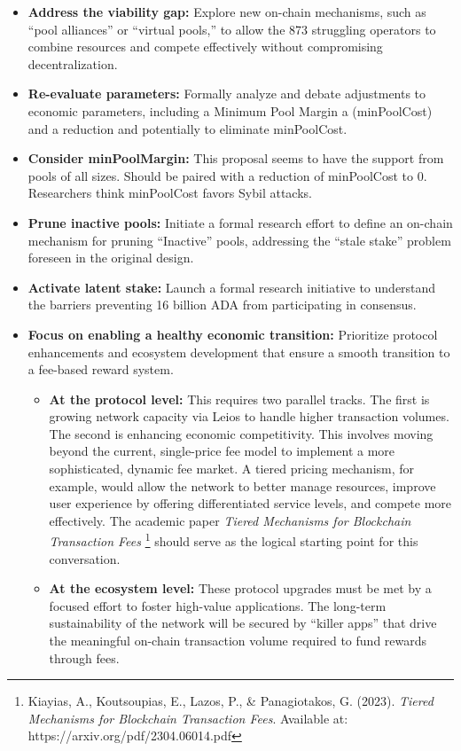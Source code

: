 \documentclass[11pt, letterpaper]{article}
\begin{document}
\begin{itemize}
    \item \textbf{Address the viability gap:} Explore new on-chain mechanisms, such as ``pool alliances'' or ``virtual pools,'' to allow the 873 struggling 
	operators to combine resources and compete effectively without compromising decentralization.
    
    \item \textbf{Re-evaluate parameters:} Formally analyze and debate adjustments to economic parameters, including a Minimum Pool Margin a (minPoolCost) and a reduction 
	and potentially to eliminate minPoolCost.

    \item \textbf{Consider minPoolMargin:} This proposal seems to have the support from pools of all sizes. Should be paired with a reduction of minPoolCost 
	to 0. Researchers think minPoolCost favors Sybil attacks.

	\item \textbf{Prune inactive pools:} Initiate a formal research effort to define an on-chain mechanism for pruning ``Inactive'' pools, addressing the 
	``stale stake'' problem foreseen in the original design.

    \item \textbf{Activate latent stake:} Launch a formal research initiative to understand the barriers preventing 16 billion ADA from participating in consensus.

	\item \textbf{Focus on enabling a healthy economic transition:} Prioritize protocol enhancements and ecosystem development that ensure a smooth transition to 
	a fee-based reward system.
    \begin{itemize}
        \item \textbf{At the protocol level:} This requires two parallel tracks. The first is growing network capacity via Leios to handle higher 
		transaction volumes. The second is enhancing economic competitivity. This involves moving beyond the current, single-price fee model to implement 
		a more sophisticated, dynamic fee market. A tiered pricing mechanism, for example, would allow the network to better manage resources, improve user 
		experience by offering differentiated service levels, and compete more effectively. The academic paper \emph{Tiered Mechanisms for Blockchain Transaction Fees}
		\footnote{Kiayias, A., Koutsoupias, E., Lazos, P., \& Panagiotakos, G. (2023). \emph{Tiered Mechanisms for Blockchain Transaction Fees}. Available at: https://arxiv.org/pdf/2304.06014.pdf} should 
		serve as the logical starting point for this conversation.

        \item \textbf{At the ecosystem level:} These protocol upgrades must be met by a focused effort to foster high-value applications. The long-term sustainability 
		of the network will be secured by ``killer apps'' that drive the meaningful on-chain transaction volume required to fund rewards through fees.
    \end{itemize}

\end{itemize}
\end{document}
